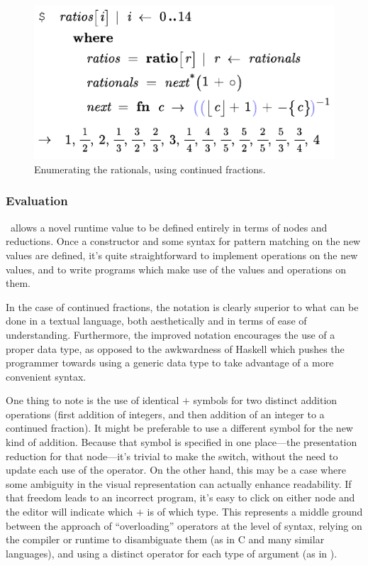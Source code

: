 
\begin{figure}[t]
  \centering
    
  \includegraphics[scale=0.6]{src/image/rationals.pdf}
  
  \caption{Enumerating the rationals, using continued fractions.}
  \label{fig-rationals}
\end{figure}

\subsubsection{Evaluation}
\Meta\ allows a novel runtime value to be defined entirely in terms of nodes and reductions. Once a constructor and some syntax for pattern matching on the new values are defined, it's quite straightforward to implement operations on the new values, and to write programs which make use of the values and operations on them.

In the case of continued fractions, the notation is clearly superior to what can be done in a textual language, both aesthetically and in terms of ease of understanding. Furthermore, the improved notation encourages the use of a proper data type, as opposed to the awkwardness of Haskell which pushes the programmer towards using a generic data type to take advantage of a more convenient syntax.

One thing to note is the use of identical $+$ symbols for two distinct addition operations (first addition of integers, and then addition of an integer to a continued fraction). It might be preferable to use a different symbol for the new kind of addition. Because that symbol is specified in one place---the presentation reduction for that node---it's trivial to make the switch, without the need to update each use of the operator. On the other hand, this may be a case where some ambiguity in the visual representation can actually enhance readability. If that freedom leads to an incorrect program, it's easy to click on either node and the editor will indicate which $+$ is of which type. This represents a middle ground between the approach of ``overloading'' operators at the level of syntax, relying on the compiler or runtime to disambiguate them (as in C and many similar languages), and using a distinct operator for each type of argument (as in ).

